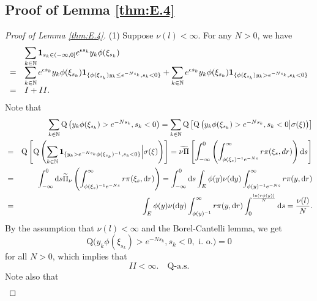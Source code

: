 \documentclass[12pt,a4paper]{amsart}
\numberwithin{equation}{section}
\theoremstyle{plain}
\theoremstyle{definition}
\theoremstyle{remark}
\begin{document}
\subsection{Proof of Lemma   \ref{thm:E.4}}
\begin{proof}[Proof of Lemma \ref{thm:E.4}] 
(1) Suppose $\nu(l)<\infty$.
For any $N>0$, we have
\begin{equation}\label{sum}
\begin{array}{rl}
&\displaystyle\sum_{k\in \mathbb N}{\bf 1}_{s_k\in(-\infty,0]}e^{\epsilon s_k}y_k\phi(\xi_{s_k})\\
=&\displaystyle\sum_{k\in \mathbb N}e^{\epsilon s_k}y_k\phi(\xi_{s_k})
{\bf 1}_{\{\phi(\xi_{s_k})y_k\le e^{-Ns_k},s_k<0\}}
+\sum_{k\in \mathbb N}e^{\epsilon s_k}y_k\phi(\xi_{s_k}){\bf 1}_{\{\phi(\xi_{s_k})y_k>e^{-Ns_k},s_k<0\}}\\
=&I+II.
\end{array}
\end{equation}
Note that
\begin{eqnarray*}
&&\sum_{k\in\mathbb N} \mathrm Q\left(y_k\phi(\xi_{s_k}) > e^{-Ns_k},s_k<0\right)
=\sum_{k\in\mathbb N} \mathrm Q\left[\mathrm Q\left(y_k\phi(\xi_{s_k})>e^{-N s_k}, s_k<0\big|\sigma(\xi)\right)\right]\\
&=&\mathrm Q\left[\mathrm Q\left(\sum_{k\in\mathbb N}{\bf 1}_{\{y_k>e^{-N s_k}\phi(\xi_{s_k})^{-1},s_k<0\}}\Big|\sigma(\xi)\right)\right]=\widetilde{\nu\Pi}\left[\int_{-\infty}^0 \left(\int^{\infty}_{\phi(\xi_s)^{-1}e^{-N s}}r \pi(\xi_s, dr)\right)\mathrm ds\right]\\
&=&\int_{-\infty}^0  \mathrm ds\widetilde{\Pi}_\nu\left(\int^{\infty}_{\phi(\xi_s)^{-1}e^{-N s}}r \pi(\xi_s, \mathrm dr)\right)=\int_{-\infty}^0 \mathrm ds \int_E \phi(y)\nu(\mathrm dy)\int^{\infty}_{\phi(y)^{-1} e^{-N s}}r\pi(y, \mathrm dr)\\
&=& \int_E\phi(y)\nu(\mathrm dy)\int_{\phi(y)^{-1}}^\infty r\pi(y, \mathrm dr)\int^{\frac{\ln (r\phi(y))}{N}}_{0}\mathrm ds=\dfrac{\nu(l)}{N}.
\end{eqnarray*}
By the assumption that $\nu(l)<\infty$ and the Borel-Cantelli lemma,  we get
\begin{equation}\label{io}
\mathrm Q\Big(y_k\phi(\xi_{s_k})>e^{-N s_k},s_k<0,\mbox{ i. o.}\Big)=0
\end{equation}
for all $N>0$,  which implies that
\begin{equation}\label{big}
II<\infty.\quad \mathrm Q\mbox{-a.s.}
\end{equation}
Note also that
$$
\begin{array}{rl}

\end{array}$$
\end{proof}
\end{document}
